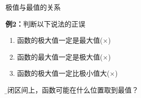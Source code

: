 \begin{frame}{极值与最值的关系}
	\linespread{1.2}\pause 
	\begin{exampleblock}{{\bf 例2：}判断以下说法的正误\hfill }\pause 
		\begin{enumerate}
		  \item 函数的极大值一定是最大值\quad\pause  (\alert{$\times$})\pause 
		  \item 函数的最大值一定是极大值\quad\pause  (\alert{$\times$})\pause 
		  \item 函数的极大值一定比极小值大\quad\pause  (\alert{$\times$})\pause 
		\end{enumerate}
	\end{exampleblock}
	{}{\b 在闭区间上，函数可能在什么位置取到最值？}\pause 
	\vspace{-1em}
	\begin{columns}
			\begin{center}
				\pause
							\end{center}
			\begin{center}
				\pause

\end{center}
\end{columns}
\end{frame}

